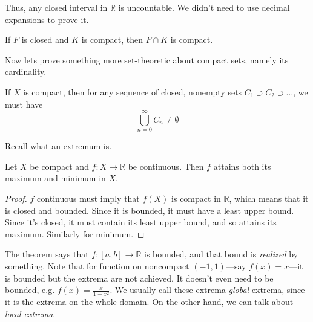   Thus, any closed interval in $\mathbb{R}$ is uncountable. We didn't need to use decimal expansions to prove it. 

  \begin{corollary}
    \label{thm:closed-intersect-compact-is-compact}
    If $F$ is closed and $K$ is compact, then $F \cap K$ is compact. 
  \end{corollary}

  Now lets prove something more set-theoretic about compact sets, namely its cardinality. 

  \begin{theorem}
    \label{thm:nested-sequence-theorem}
    If $X$ is compact, then for any sequence of closed, nonempty sets $C_1 \supset C_2 \supset \ldots$, we must have 
    \begin{equation}
      \bigcup_{n=0}^{\infty} C_n \neq \emptyset
    \end{equation}
  \end{theorem}

	Recall what an \hyperref[st-def:extrema_functions]{extremum} is. 

  \begin{theorem}
		\label{thm:evt}
    Let $X$ be compact and $f: X \rightarrow \mathbb{R}$ be continuous. Then $f$ attains both its maximum and minimum in $X$.  
  \end{theorem}
  \begin{proof}
    $f$ continuous must imply that $f(X)$ is compact in $\mathbb{R}$, which means that it is closed and bounded. Since it is bounded, it must have a least upper bound. Since it's closed, it must contain its least upper bound, and so attains its maximum. Similarly for minimum.
  \end{proof}

  The theorem says that $f: [a, b] \to \mathbb{R}$ is bounded, and that bound is \textit{realized} by something. Note that for function on noncompact $(-1, 1)$---say $f(x) = x$---it is bounded but the extrema are not achieved. It doesn't even need to be bounded, e.g. $f(x) = \frac{x}{1 - x^2}$. We usually call these extrema \textit{global} extrema, since it is the extrema on the whole domain. On the other hand, we can talk about \textit{local extrema}. 

